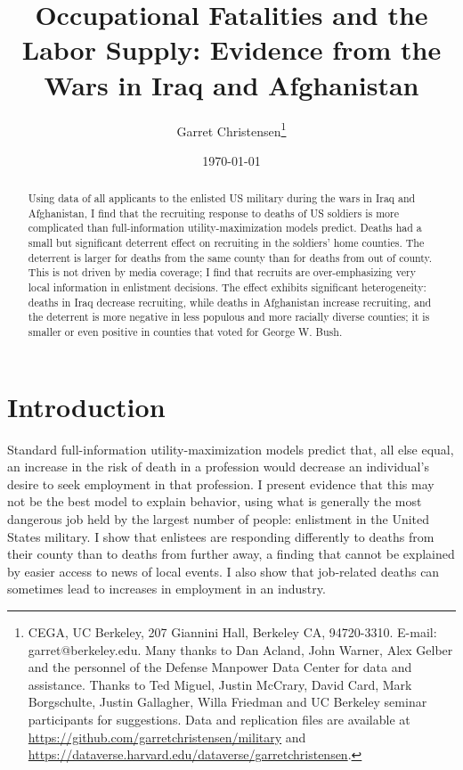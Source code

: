 \documentclass[12pt] {article}
\begin{document}
\title{Occupational Fatalities and the Labor Supply: Evidence from the Wars in Iraq and
Afghanistan}
\date{\today}
\author{Garret Christensen\thanks{
CEGA, UC Berkeley, 207 Giannini Hall, Berkeley CA, 94720-3310. E-mail: garret@berkeley.edu. 
Many thanks to Dan Acland, John Warner, Alex Gelber and the personnel
of the Defense Manpower Data Center for data and assistance. Thanks
to Ted Miguel, Justin McCrary, David Card, Mark Borgschulte, Justin
Gallagher, Willa Friedman and UC Berkeley seminar participants for
suggestions. Data and replication files are available at \url{https://github.com/garretchristensen/military} and \url{https://dataverse.harvard.edu/dataverse/garretchristensen}.}}
\maketitle



\begin{abstract}

Using data of all applicants to the enlisted US military during the wars in Iraq and Afghanistan, I find that the recruiting response to deaths of US soldiers is more complicated than full-information utility-maximization models predict. Deaths had a small but significant deterrent effect on recruiting in the soldiers' home counties. The deterrent is larger for deaths from the same county than for deaths from out of county. This is not driven by media coverage; I find that recruits are over-emphasizing very local information in enlistment decisions. The effect exhibits significant heterogeneity: deaths in Iraq decrease recruiting, while deaths in Afghanistan increase recruiting, and the deterrent is more negative in less populous and more racially diverse counties; it is smaller or even positive in counties that voted for George W. Bush.

\end{abstract}




\section{Introduction\label{sec:Introduction}}
Standard full-information utility-maximization models predict that, all else equal, an increase in the risk of death in a profession would decrease an individual's desire to seek employment in that profession. I present evidence that this may not be the best model to explain behavior, using what is generally the most dangerous job held by the largest number of people: enlistment in the United States military. I show that enlistees are responding differently to deaths from their county than to deaths from further away, a finding that cannot be explained by easier access to news of local events. I also show that job-related deaths can sometimes lead to increases in employment in an industry.
\end{document}
